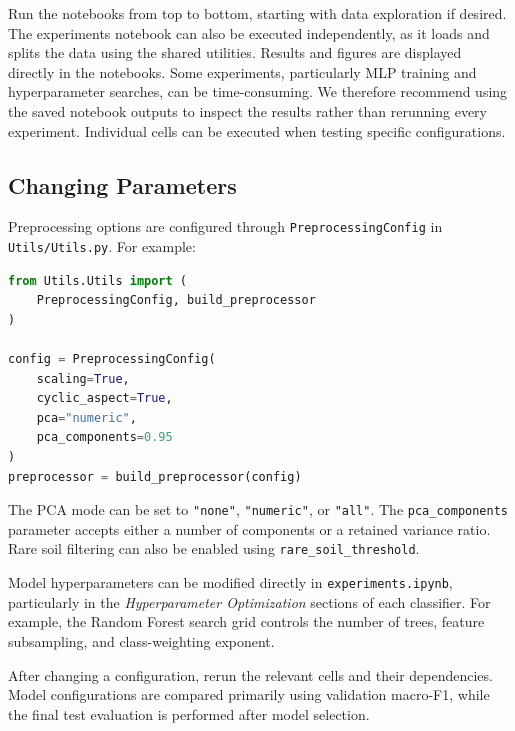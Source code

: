 \documentclass[10pt,a4paper]{article}
\begin{document}
Run the notebooks from top to bottom, starting with data
exploration if desired. The experiments notebook can also
be executed independently, as it loads and splits the data
using the shared utilities. Results and figures are displayed
directly in the notebooks.
Some experiments, particularly MLP training and hyperparameter
searches, can be time-consuming. We therefore recommend using
the saved notebook outputs to inspect the results rather than
rerunning every experiment. Individual cells can be executed
when testing specific configurations.

\subsection*{Changing Parameters}

Preprocessing options are configured through
\texttt{PreprocessingConfig} in \texttt{Utils/Utils.py}.
For example:

\begin{lstlisting}[language=Python]
from Utils.Utils import (
    PreprocessingConfig, build_preprocessor
)

config = PreprocessingConfig(
    scaling=True,
    cyclic_aspect=True,
    pca="numeric",
    pca_components=0.95
)
preprocessor = build_preprocessor(config)
\end{lstlisting}

The PCA mode can be set to \texttt{"none"},
\texttt{"numeric"}, or \texttt{"all"}.
The \texttt{pca\_components} parameter accepts either
a number of components or a retained variance ratio.
Rare soil filtering can also be enabled using
\texttt{rare\_soil\_threshold}.

Model hyperparameters can be modified directly in
\texttt{experiments.ipynb}, particularly in the
\emph{Hyperparameter Optimization} sections of each
classifier. For example, the Random Forest search grid
controls the number of trees, feature subsampling,
and class-weighting exponent.

After changing a configuration, rerun the relevant cells
and their dependencies. Model configurations are compared
primarily using validation macro-F1, while the final test
evaluation is performed after model selection.
\end{document}
